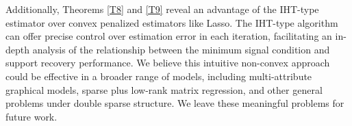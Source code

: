 \documentclass[12pt]{article}
\begin{document}
Additionally, Theorems \ref{T8} and \ref{T9} reveal an advantage of the IHT-type estimator over convex penalized estimators like Lasso.
The IHT-type algorithm can offer precise control over estimation error in each iteration, facilitating an in-depth analysis of the relationship between the minimum signal condition and support recovery performance. 
We believe this intuitive non-convex approach could be effective in a broader range of models, including {multi-attribute} graphical models, {sparse plus} low-rank matrix regression, and other general problems under double sparse structure. We leave these meaningful problems for future work.


\end{document}
